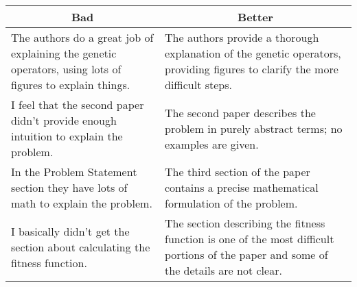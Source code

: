 \begin{center}
\begin{tabular}{|p{2.5in}|p{2.5in}|}
\hline
\multicolumn{1}{|c|}{\bf Bad} &
\multicolumn{1}{c|}{\bf Better}\\\hline\hline
\begin{minipage}{2.5in}
\smallskip
The authors do a great job of
explaining the genetic operators, using
lots of figures to explain things.
\smallskip
\end{minipage}
&
\begin{minipage}{2.5in}
\smallskip
The authors provide a thorough explanation of
the genetic operators, providing figures to
clarify the more difficult steps.
\smallskip
\end{minipage}
\\\hline
\begin{minipage}{2.5in}
\smallskip
I feel that the second paper didn't provide enough
intuition to explain the problem.
\smallskip
\end{minipage}
&
\begin{minipage}{2.5in}
\smallskip
The second paper describes the problem in purely
abstract terms; no examples are given.
\smallskip
\end{minipage}
\\\hline
\begin{minipage}{2.5in}
\smallskip
In the Problem Statement section they have lots of math to
explain the problem.
\smallskip
\end{minipage}
&
\begin{minipage}{2.5in}
\smallskip
The third section of the paper contains
a  precise mathematical formulation of the problem.
\smallskip
\end{minipage}
\\\hline
\begin{minipage}{2.5in}
\smallskip
I basically didn't get the section about calculating the fitness function.
\smallskip
\end{minipage}
&
\begin{minipage}{2.5in}
\smallskip
The section describing the fitness function is one of the most
difficult portions of the paper and some of the details are not clear.
\smallskip
\end{minipage}
\\\hline
\end{tabular}
\end{center}



